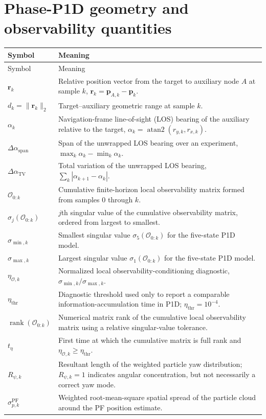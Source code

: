 \section*{Phase-P1D geometry and observability quantities}
\begin{longtable}{p{}p{}}
\toprule
Symbol & Meaning\\
\midrule
\endfirsthead
\toprule
Symbol & Meaning\\
\midrule
\endhead
$\bm r_k$ & Relative position vector from the target to auxiliary node $A$ at sample $k$, $\bm r_k=\bm p_{A,k}-\bm p_k$.\\
$d_k=\lVert\bm r_k\rVert_2$ & Target--auxiliary geometric range at sample $k$.\\
$\alpha_k$ & Navigation-frame line-of-sight (LOS) bearing of the auxiliary relative to the target, $\alpha_k=\operatorname{atan2}(r_{y,k},r_{x,k})$.\\
$\Delta\alpha_{\mathrm{span}}$ & Span of the unwrapped LOS bearing over an experiment, $\max_k\alpha_k-\min_k\alpha_k$.\\
$\Delta\alpha_{\mathrm{TV}}$ & Total variation of the unwrapped LOS bearing, $\sum_k|\alpha_{k+1}-\alpha_k|$.\\
$\mathcal O_{0:k}$ & Cumulative finite-horizon local observability matrix formed from samples $0$ through $k$.\\
$\sigma_j(\mathcal O_{0:k})$ & $j$th singular value of the cumulative observability matrix, ordered from largest to smallest.\\
$\sigma_{\min,k}$ & Smallest singular value $\sigma_5(\mathcal O_{0:k})$ for the five-state P1D model.\\
$\sigma_{\max,k}$ & Largest singular value $\sigma_1(\mathcal O_{0:k})$ for the five-state P1D model.\\
$\eta_{\mathcal O,k}$ & Normalized local observability-conditioning diagnostic, $\sigma_{\min,k}/\sigma_{\max,k}$.\\
$\eta_{\mathrm{thr}}$ & Diagnostic threshold used only to report a comparable information-accumulation time in P1D; $\eta_{\mathrm{thr}}=10^{-4}$.\\
$\operatorname{rank}(\mathcal O_{0:k})$ & Numerical matrix rank of the cumulative local observability matrix using a relative singular-value tolerance.\\
$t_{\eta}$ & First time at which the cumulative matrix is full rank and $\eta_{\mathcal O,k}\geq\eta_{\mathrm{thr}}$.\\
$R_{\psi,k}$ & Resultant length of the weighted particle yaw distribution; $R_{\psi,k}=1$ indicates angular concentration, but not necessarily a correct yaw mode.\\
$\sigma_{p,k}^{\mathrm{PF}}$ & Weighted root-mean-square spatial spread of the particle cloud around the PF position estimate.\\
\bottomrule
\end{longtable}
